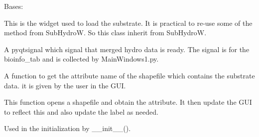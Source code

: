 \documentclass[letterpaper,10pt,english]{sphinxmanual}
\begin{document}
\begin{fulllineitems}
\label{\detokenize{index:src_GUI.hydro_GUI_2.SubstrateW}}
Bases: {\hyperref[\detokenize{index:src_GUI.hydro_GUI_2.SubHydroW}]{}}

This is the widget used to load the substrate. It is practical to re-use some of the method from SubHydroW.
So this class inherit from SubHydroW.

\begin{fulllineitems}
\label{\detokenize{index:src_GUI.hydro_GUI_2.SubstrateW.drop_merge}}
A pyqtsignal which signal that merged hydro data is ready. The signal is for the bioinfo\_tab and is collected
by MainWindows1.py.

\end{fulllineitems}


\begin{fulllineitems}
\label{\detokenize{index:src_GUI.hydro_GUI_2.SubstrateW.get_att_name}}
A function to get the attribute name of the shapefile which contains the substrate data. it is given by the user
in the GUI.

\end{fulllineitems}


\begin{fulllineitems}
\label{\detokenize{index:src_GUI.hydro_GUI_2.SubstrateW.get_attribute_from_shp}}
This function opens a shapefile and obtain the attribute. It then update the GUI
to reflect this and also update the label as needed.

\end{fulllineitems}


\begin{fulllineitems}
\label{\detokenize{index:src_GUI.hydro_GUI_2.SubstrateW.init_iu}}
Used in the initialization by \_\_init\_\_().


\end{fulllineitems}
\end{fulllineitems}
\end{document}
